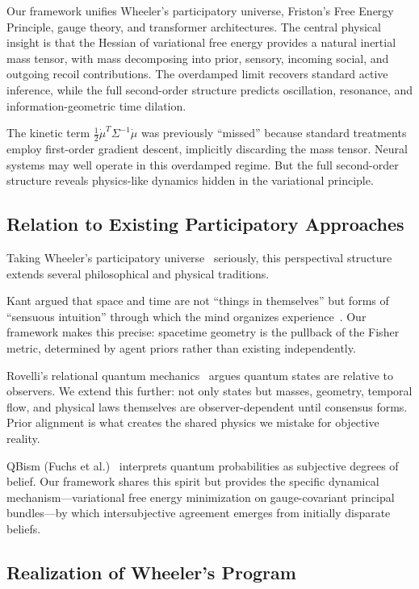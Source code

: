 \documentclass[11pt]{article}
\begin{document}
Our framework unifies Wheeler's participatory universe, Friston's Free Energy Principle, gauge theory, and transformer architectures. The central physical insight is that the Hessian of variational free energy provides a natural inertial mass tensor, with mass decomposing into prior, sensory, incoming social, and outgoing recoil contributions. The overdamped limit recovers standard active inference, while the full second-order structure predicts oscillation, resonance, and information-geometric time dilation.

The kinetic term $\frac{1}{2}\dot{\mu}^T\Sigma^{-1}\dot{\mu}$ was previously ``missed'' because standard treatments employ first-order gradient descent, implicitly discarding the mass tensor. Neural systems may well operate in this overdamped regime. But the full second-order structure reveals physics-like dynamics hidden in the variational principle.

\subsection{Relation to Existing Participatory Approaches}

Taking Wheeler's participatory universe~\cite{Wheeler1990} seriously, this perspectival structure extends several philosophical and physical traditions.

Kant argued that space and time are not ``things in themselves'' but forms of ``sensuous intuition'' through which the mind organizes experience~\cite{Kant1781}. Our framework makes this precise: spacetime geometry is the pullback of the Fisher metric, determined by agent priors rather than existing independently.

Rovelli's relational quantum mechanics~\cite{Rovelli1996} argues quantum states are relative to observers. We extend this further: not only states but masses, geometry, temporal flow, and physical laws themselves are observer-dependent until consensus forms. Prior alignment is what creates the shared physics we mistake for objective reality.

QBism (Fuchs et al.)~\cite{Fuchs2014} interprets quantum probabilities as subjective degrees of belief. Our framework shares this spirit but provides the specific dynamical mechanism---variational free energy minimization on gauge-covariant principal bundles---by which intersubjective agreement emerges from initially disparate beliefs.

\subsection{Realization of Wheeler's Program}
\end{document}
